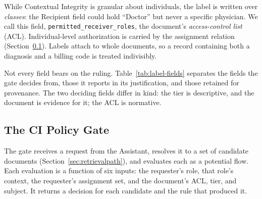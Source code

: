 While Contextual Integrity is granular about individuals, the label is written
over \textit{classes}: the Recipient field could hold ``Doctor'' but never a
specific physician. We call this field, \texttt{permitted\_receiver\_roles},
the document's \textit{access-control list} (ACL). Individual-level
authorization is carried by the assignment relation (Section~\ref{sec:gate}).
Labels attach to whole documents, so a record containing both a diagnosis and
a billing code is treated indivisibly.

Not every field bears on the ruling. Table~\ref{tab:label-fields} separates the
fields the gate decides from, those it reports in its justification, and those
retained for provenance. The two deciding fields differ in kind: the tier is
descriptive, and the document is evidence for it; the ACL is normative.

\begin{table}[t]
\centering
\caption{Fields of the document label by their role in the gate's decision
procedure.}
\label{tab:label-fields}
\footnotesize
{}
\end{table}

\subsection{The CI Policy Gate}
\label{sec:gate}
The gate receives a request from the Assistant, resolves it to a set of
candidate documents (Section~\ref{sec:retrievalpath}), and evaluates each as a
potential flow. Each evaluation is a function of six inputs: the requester's
role, that role's context, the requester's assignment set, and the document's
ACL, tier, and subject. It returns a decision for each candidate and the rule
that produced it.

